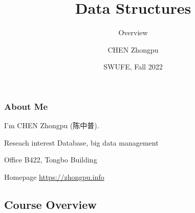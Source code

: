 \documentclass[aspectratio=169, 14pt]{beamer}
\title[Data Structures] %
{Data Structures}
\subtitle{Overview}
\author[CHEN Zhongpu] %
{CHEN Zhongpu}
\institute[] %
{
  School of Computing and Artificial Intelligence \\
  \href{mailto:zpchen@swufe.edu.cn}{zpchen@swufe.edu.cn}
}
\date[] %
{SWUFE, Fall 2022}
\begin{document}
\frame{\titlepage}

\begin{frame}
    \frametitle{About Me}
    I'm CHEN Zhongpu (陈中普).
    
    \begin{block}{ Reseach interest}
        Database, big data management 
    \end{block}
    
    \begin{block}{ Office}
        B422, Tongbo Building
    \end{block}
    
    \begin{block}{ Homepage}
        \href{https://zhongpu.info}{https://zhongpu.info}
    \end{block}
    
\end{frame}

{
    \begin{frame}
        \section{\textcolor{darkmidnightblue}{Course Overview}}
    \end{frame}

}
\end{document}
